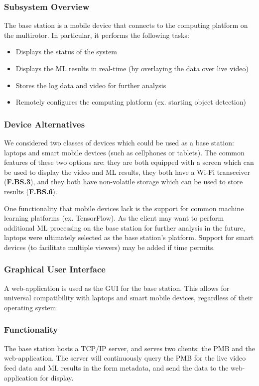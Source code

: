 \subsubsection{Subsystem Overview}

The base station is a mobile device that connects to the computing platform on the multirotor. In particular, it performs the following tasks:
\begin{itemize}
    \item Displays the status of the system
    \item Displays the ML results in real-time (by overlaying the data over live video)
    \item Stores the log data and video for further analysis
    \item Remotely configures the computing platform (ex. starting object detection)
\end{itemize}

\subsubsection{Device Alternatives}
We considered two classes of devices which could be used as a base station: laptops and smart mobile devices (such as cellphones or tablets). The common features of these two options are: they are both equipped with a screen which can be used to display the video and ML results, they both have a Wi-Fi transceiver (\textbf{F.BS.3}), and they both have non-volatile storage which can be used to store results (\textbf{F.BS.6}).

One functionality that mobile devices lack is the support for common machine learning platforms (ex. TensorFlow). As the client may want to perform additional ML processing on the base station for further analysis in the future, laptops were ultimately selected as the base station's platform. Support for smart devices (to facilitate multiple viewers) may be added if time permits.

\subsubsection {Graphical User Interface}
A web-application is used as the GUI for the base station. This allows for universal compatibility with laptops and smart mobile devices, regardless of their operating system.

\subsubsection{Functionality}
The base station hosts a TCP/IP server, and serves two clients: the PMB and the web-application. The server will continuously query the PMB for the live video feed data and ML results in the form metadata, and send the data to the web-application for display.

